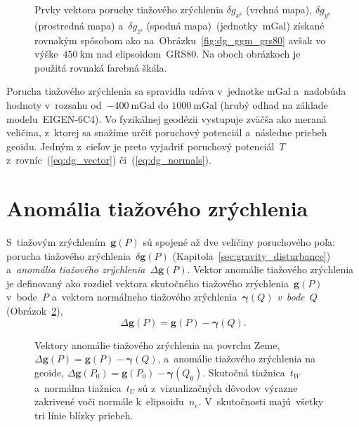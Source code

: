 \documentclass[a4paper, 12pt]{book}
\let\vec\mathbf
\begin{document}
\begin{figure}
\caption{Prvky vektora poruchy tiažového zrýchlenia $\delta g_{x^\mathrm{s}}$ 
(vrchná mapa), $\delta g_{y^\mathrm{s}}$ (prostredná mapa) a~$\delta 
g_{z^\mathrm{s}}$ (spodná mapa)~(jednotky~$\mathrm{mGal}$) získané rovnakým 
spôsobom ako na~Obrázku~\ref{fig:dg_ggm_grs80} avšak vo výške~$450\ 
\mathrm{km}$ nad elipsoidom~GRS80.  Na oboch obrázkoch je použitá rovnaká 
farebná škála.}
\label{fig:dg_ggm_450km}
\end{figure}

Porucha tiažového zrýchlenia sa spravidla udáva v~jednotke mGal a~nadobúda 
hodnoty v~rozsahu od~$-400\ \mathrm{mGal}$ do $1000\ \mathrm{mGal}$ (hrubý 
odhad na základe modelu~EIGEN-6C4).  Vo fyzikálnej geodézii vystupuje zväčša 
ako meraná veličina, z~ktorej sa snažíme určiť poruchový potenciál a~následne 
priebeh geoidu.  Jedným z~cieľov je preto vyjadriť poruchový potenciál~$T$ 
z~rovníc~(\ref{eq:dg_vector}) či~(\ref{eq:dg_normals}).





\section{Anomália tiažového zrýchlenia}
\label{sec:gravity_anomaly}

S~tiažovým zrýchlením~$\vec g(P)$ sú spojené až dve veličiny poruchového poľa: 
porucha tiažového zrýchlenia~$\delta \vec g(P)$ 
(Kapitola~\ref{sec:gravity_disturbance}) a~\emph{anomália tiažového 
zrýchlenia}~$\Delta \vec g(P)$.  Vektor anomálie tiažového zrýchlenia je 
definovaný ako rozdiel vektora skutočného tiažového zrýchlenia~$\vec g(P)$ 
v~bode~$P$ a~vektora normálneho tiažového zrýchlenia~$\boldsymbol\gamma(Q)$ 
\emph{v~bode~$Q$} (Obrázok~\ref{fig:gravity_anomaly}),
%
\begin{equation}
\label{eq:Dg_vector_earth}
\Delta \vec g(P) = \vec g(P) - \boldsymbol\gamma (Q).
\end{equation}

\begin{figure}[bt]
\centering

\caption{Vektory anomálie tiažového zrýchlenia na povrchu Zeme,~$\Delta \vec 
g(P) = \vec g(P) - \boldsymbol \gamma(Q)$, a~anomálie tiažového zrýchlenia na 
geoide, $\Delta \vec g(P_0) = \vec g(P_0) - \boldsymbol\gamma(Q_0)$.  Skutočná 
tiažnica~$t_W$ a~normálna tiažnica~$t_U$ sú z~vizualizačných dôvodov výrazne 
zakrivené voči normále k~elipsoidu~$n_e$.  V~skutočnosti majú~všetky tri línie 
blízky priebeh.}
\label{fig:gravity_anomaly}
\end{figure}
\end{document}
